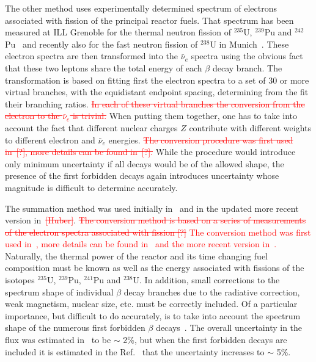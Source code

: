 \documentclass[aps,twocolumn,preprintnumbers,amsmath,superscriptaddress,amssymb,floats,nofootinbib]{revtex4-1}
\begin{document}
 The other method uses experimentally determined spectrum of electrons associated with fission of the principal reactor fuels. That spectrum has been 
 measured at ILL Grenoble for the thermal neutron fission of $^{235}$U, $^{239}$Pu and $^{242}$Pu~\cite{vonFeilitzsch,Schreckenbach,Hahn} and recently also for the fast neutron fission of $^{238}$U
 in Munich~\cite{Haag}. These electron spectra are then transformed into the $\bar{\nu}_e$ spectra using the obvious fact that these two leptons share the total energy
 of each $\beta$ decay branch. The transformation is based on fitting first the electron spectra to a set of 30 or more virtual branches, with the equidistant
 endpoint spacing, determining from the fit their branching ratios. 
 \textcolor{red}{\st{In each of these virtual branches the conversion from the electron to the $\bar{\nu}_e$ is 
 trivial.}}
 When putting them together, one has to take into account the fact that different nuclear charges $Z$ contribute with different weights to different electron
 and $\bar{\nu}_e$ energies. \textcolor{red}{\st{The conversion procedure was first used in~[?], more details can be found in~[?].}}
 While the procedure would introduce only minimum uncertainty if all decays would be of the allowed shape, the presence
 of the first forbidden decays again introduces uncertainty whose magnitude is difficult to determine accurately.

The summation method was used
initially in~\cite{Davis,Vogel81,Klapdor-Pu,Klapdor-U,Kopeikin} and in the updated more recent version in~\cite{Mueller}\textcolor{red}{\st{[Huber]}}. \textcolor{red}{\st{The conversion method is based on a series
of measurements of the electron spectra associated with fission [?]}}
\textcolor{red}{The conversion method was first used in~\cite{vonFeilitzsch,Schreckenbach,Hahn}, more details can be found in~\cite{Vogel07} and the more recent version in~\cite{Huber}.} 
Naturally, the thermal power of the reactor and its time changing fuel composition must be known as well as the energy associated with fissions of the isotopes $^{235}$U, $^{239}$Pu, $^{241}$Pu
and $^{238}$U. In addition, small corrections to the spectrum shape of individual $\beta$ decay branches due to the radiative correction, weak magnetism,
nuclear size,
etc. must be correctly included. Of a particular importance, but difficult to do accurately, is to take into account the spectrum shape of the numerous
first forbidden $\beta$ decays~\cite{Hayes}. The overall uncertainty in the flux was estimated in~\cite{Mueller, Huber} to be $\sim$ 2\%, but when the
first forbidden decays are included it is estimated in the Ref.~\cite{Hayes} that the uncertainty increases to $\sim$ 5\%.
\end{document}
